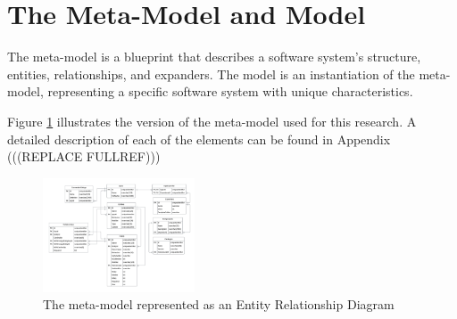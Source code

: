 \section{The Meta-Model and Model} \label{sec_artifact_meta_model}

The meta-model is a blueprint that describes a software system's structure, entities,
relationships, and expanders. The model is an instantiation of the meta-model,
representing a specific software system with unique characteristics. 

Figure \ref{fig_erd} illustrates the version of the meta-model used for this research. A
detailed description of each of the elements can be found in Appendix
(((REPLACE FULLREF)))

\begin{figure}[htbp]
    \centering
    \includegraphics[width=0.4\textwidth]{figures/erd.pdf}
    \caption[The meta-model represented as an Entity Relationship Diagram]{The meta-model represented as an Entity Relationship Diagram}
    \label{fig_erd}
\end{figure}